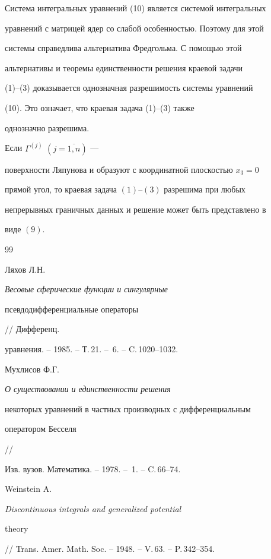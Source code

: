 Система интегральных уравнений (10) является системой интегральных


уравнений с матрицей ядер со слабой особенностью. Поэтому для этой


системы справедлива альтернатива Фредгольма. С помощью этой


альтернативы и теоремы единственности решения краевой задачи


(1)--(3) доказывается однозначная разрешимость системы уравнений


(10). Это означает, что краевая задача (1)--(3) также


однозначно разрешима.








\begin{thmnonum}


Если $\Gamma^{(j)}$ $(j=\overline{1,n})$ ---


поверхности Ляпунова и образуют с координатной плоскостью $x_3=0$


прямой угол, то краевая задача $(1)$--$(3)$ разрешима при любых


непрерывных граничных данных и решение может быть представлено в


виде $(9)$.


\end{thmnonum}





\begin{thebibliography}{99}







Ляхов Л.Н. {\em Весовые сферические функции и сингулярные


псевдодифференциальные операторы} // Дифференц.


уравнения. -- 1985. -- Т.\,21. -- \No\,6. -- C.\,1020--1032.




Мухлисов Ф.Г. {\em О существовании и единственности решения


некоторых уравнений в частных производных с дифференциальным


оператором Бесселя} //


Изв. вузов. Математика. -- 1978. -- \No\,1. -- C.\,66--74.




Weinstein A. {\em Discontinuous integrals and generalized potential


theory} // Trans. Amer. Math. Soc. -- 1948. -- V.\,63. -- P.\,342--354.








\end{thebibliography}





